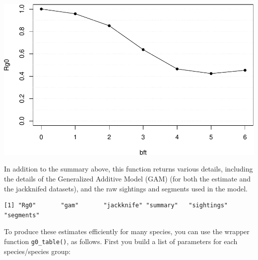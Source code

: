 \documentclass[
]{book}
\newenvironment{Shaded}{\begin{snugshade}}{\end{snugshade}}
\newcommand{\DataTypeTok}[1]{\textcolor[rgb]{0.13,0.29,0.53}{#1}}
\newcommand{\DecValTok}[1]{\textcolor[rgb]{0.00,0.00,0.81}{#1}}
\newcommand{\KeywordTok}[1]{\textcolor[rgb]{0.13,0.29,0.53}{\textbf{#1}}}
\newcommand{\NormalTok}[1]{#1}
\newcommand{\OperatorTok}[1]{\textcolor[rgb]{0.81,0.36,0.00}{\textbf{#1}}}
\newcommand{\StringTok}[1]{\textcolor[rgb]{0.31,0.60,0.02}{#1}}
\begin{document}
\begin{Shaded}
\end{Shaded}

\includegraphics{figures/unnamed-chunk-143-1.pdf}

In addition to the summary above, this function returns various details, including the details of the Generalized Additive Model (GAM) (for both the estimate and the jackknifed datasets), and the raw sightings and segments used in the model.

\begin{verbatim}
[1] "Rg0"       "gam"       "jackknife" "summary"   "sightings" "segments" 
\end{verbatim}

To produce these estimates efficiently for many species, you can use the wrapper function \texttt{g0\_table()}, as follows. First you build a list of parameters for each species/species group:
\end{document}
